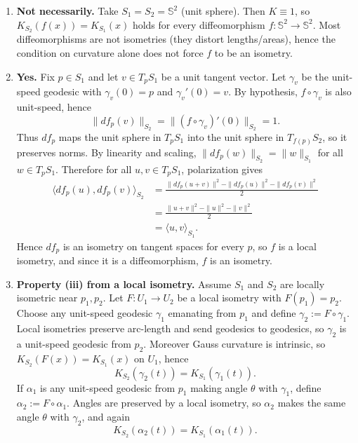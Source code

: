 \begin{solution}
\begin{enumerate}
		\item \textbf{Not necessarily.}
		Take $S_1=S_2=\mathbb{S}^2$ (unit sphere). Then $K\equiv 1$, so $K_{S_2}(f(x))=K_{S_1}(x)$ holds for every diffeomorphism
		$f:\mathbb{S}^2\to\mathbb{S}^2$. Most diffeomorphisms are not isometries (they distort lengths/areas), hence the condition on
		curvature alone does not force $f$ to be an isometry.
		
		\item \textbf{Yes.}
		Fix $p\in S_1$ and let $v\in T_pS_1$ be a unit tangent vector. Let $\gamma_v$ be the unit-speed geodesic with
		$\gamma_v(0)=p$ and $\gamma_v'(0)=v$. By hypothesis, $f\circ\gamma_v$ is also unit-speed, hence
		\[
		\|df_p(v)\|_{S_2}
		=
		\|(f\circ\gamma_v)'(0)\|_{S_2}
		=
		1.
		\]
		Thus $df_p$ maps the unit sphere in $T_pS_1$ into the unit sphere in $T_{f(p)}S_2$, so it preserves norms.
		By linearity and scaling, $\|df_p(w)\|_{S_2}=\|w\|_{S_1}$ for all $w\in T_pS_1$. Therefore for all $u,v\in T_pS_1$,
		polarization gives
		\[
\begin{aligned}
\langle df_p(u),df_p(v)\rangle_{S_2}
&=
\frac{\|df_p(u+v)\|^2-\|df_p(u)\|^2-\|df_p(v)\|^2}{2}\\
&=
\frac{\|u+v\|^2-\|u\|^2-\|v\|^2}{2}\\
&=
\langle u,v\rangle_{S_1}.
\end{aligned}
\]
		Hence $df_p$ is an isometry on tangent spaces for every $p$, so $f$ is a local isometry, and since it is a diffeomorphism,
		$f$ is an isometry.
		
		\item \textbf{Property (iii) from a local isometry.}
		Assume $S_1$ and $S_2$ are locally isometric near $p_1,p_2$.
		Let $F:U_1\to U_2$ be a local isometry with $F(p_1)=p_2$.
		Choose any unit-speed geodesic $\gamma_1$ emanating from $p_1$ and define $\gamma_2:=F\circ\gamma_1$.
		Local isometries preserve arc-length and send geodesics to geodesics, so $\gamma_2$ is a unit-speed geodesic from $p_2$.
		Moreover Gauss curvature is intrinsic, so $K_{S_2}(F(x))=K_{S_1}(x)$ on $U_1$, hence
		\[
		K_{S_2}(\gamma_2(t))=K_{S_1}(\gamma_1(t)).
		\]
		If $\alpha_1$ is any unit-speed geodesic from $p_1$ making angle $\theta$ with $\gamma_1$, define $\alpha_2:=F\circ\alpha_1$.
		Angles are preserved by a local isometry, so $\alpha_2$ makes the same angle $\theta$ with $\gamma_2$, and again
		\[
		K_{S_2}(\alpha_2(t))=K_{S_1}(\alpha_1(t)).
		\]
		

\end{enumerate}
\end{solution}
